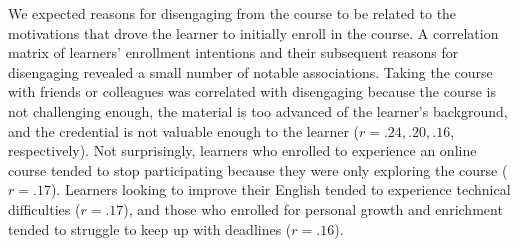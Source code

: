 \documentclass{sigchi}\usepackage[]{graphicx}\usepackage[]{color}
\begin{document}
We expected reasons for disengaging from the course to be related to the motivations that drove the learner to initially enroll in the course. A correlation matrix of learners' enrollment intentions and their subsequent reasons for disengaging revealed a small number of notable associations. Taking the course with friends or colleagues was correlated with disengaging because the course is not challenging enough, the material is too advanced of the learner's background, and the credential is not valuable enough to the learner ($r=.24, .20, .16$, respectively). Not surprisingly, learners who enrolled to experience an online course tended to stop participating because they were only exploring the course ($r=.17$). Learners looking to improve their English tended to experience technical difficulties ($r=.17$), and those who enrolled for personal growth and enrichment tended to struggle to keep up with deadlines ($r=.16$).
\end{document}
